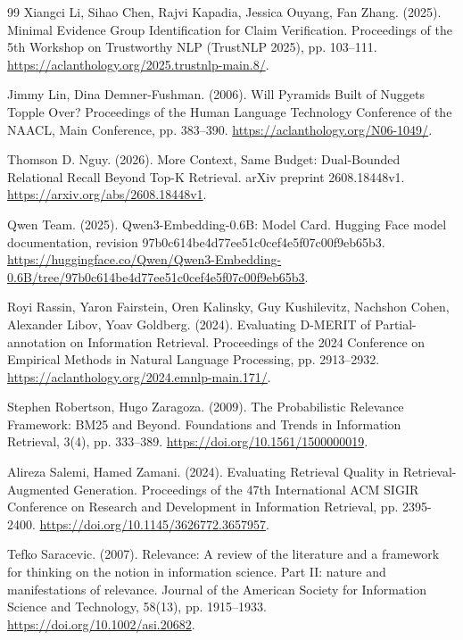 \documentclass[twoside,a4paper,11pt]{article}
\begin{document}
\begin{thebibliography}{99}
Xiangci Li, Sihao Chen, Rajvi Kapadia, Jessica Ouyang, Fan Zhang. (2025). Minimal Evidence Group Identification for Claim Verification. Proceedings of the 5th Workshop on Trustworthy NLP (TrustNLP 2025), pp. 103--111. \url{https://aclanthology.org/2025.trustnlp-main.8/}.

Jimmy Lin, Dina Demner-Fushman. (2006). Will Pyramids Built of Nuggets Topple Over? Proceedings of the Human Language Technology Conference of the NAACL, Main Conference, pp. 383--390. \url{https://aclanthology.org/N06-1049/}.

Thomson D. Nguy. (2026). More Context, Same Budget: Dual-Bounded Relational Recall Beyond Top-K Retrieval. arXiv preprint 2608.18448v1. \url{https://arxiv.org/abs/2608.18448v1}.

Qwen Team. (2025). Qwen3-Embedding-0.6B: Model Card. Hugging Face model documentation, revision 97b0c614be4d77ee51c0cef4e5f07c00f9eb65b3. \url{https://huggingface.co/Qwen/Qwen3-Embedding-0.6B/tree/97b0c614be4d77ee51c0cef4e5f07c00f9eb65b3}.

Royi Rassin, Yaron Fairstein, Oren Kalinsky, Guy Kushilevitz, Nachshon Cohen, Alexander Libov, Yoav Goldberg. (2024). Evaluating D-MERIT of Partial-annotation on Information Retrieval. Proceedings of the 2024 Conference on Empirical Methods in Natural Language Processing, pp. 2913--2932. \url{https://aclanthology.org/2024.emnlp-main.171/}.

Stephen Robertson, Hugo Zaragoza. (2009). The Probabilistic Relevance Framework: BM25 and Beyond. Foundations and Trends in Information Retrieval, 3(4), pp. 333--389. \url{https://doi.org/10.1561/1500000019}.

Alireza Salemi, Hamed Zamani. (2024). Evaluating Retrieval Quality in Retrieval-Augmented Generation. Proceedings of the 47th International ACM SIGIR Conference on Research and Development in Information Retrieval, pp. 2395-2400. \url{https://doi.org/10.1145/3626772.3657957}.

Tefko Saracevic. (2007). Relevance: A review of the literature and a framework for thinking on the notion in information science. Part II: nature and manifestations of relevance. Journal of the American Society for Information Science and Technology, 58(13), pp. 1915--1933. \url{https://doi.org/10.1002/asi.20682}.


\end{thebibliography}
\end{document}
